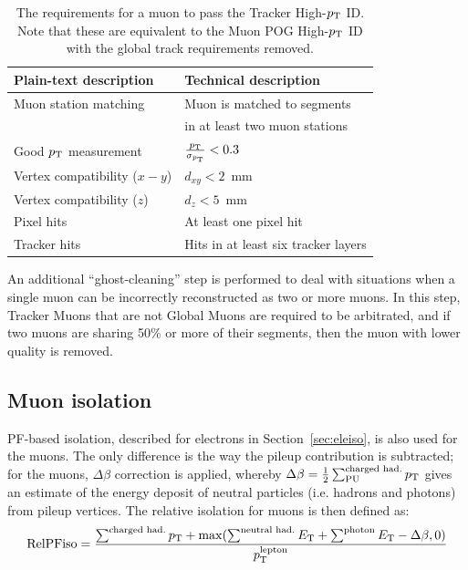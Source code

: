 \begin{table}[h]
    \begin{small}
    \begin{center}
    \begin{tabular}{l|l}
      \hline
      Plain-text description         & Technical description                 \\
      \hline
      Muon station matching          & Muon is matched to segments           \\
                                     & in at least two muon stations         \\
      Good $p_{\rm{T}}$ measurement         & $\frac{p_{\rm{T}}}{\sigma_{p_{\rm{T}}}} < 0.3$      \\
      Vertex compatibility ($x-y$)   & $d_{xy} < 2$~mm                       \\
      Vertex compatibility ($z$)     & $d_{z} < 5$~mm                        \\
      Pixel hits                     & At least one pixel hit                \\
      Tracker hits                   & Hits in at least six tracker layers   \\
      \hline
    \end{tabular}
    \caption{
      The requirements for a muon to pass the Tracker High-$p_{\rm{T}}$ ID. Note that
      these are equivalent to the Muon POG High-$p_{\rm{T}}$ ID with the global track 
      requirements removed.
      }
    \label{tab:highPtID}
    \end{center}
    \end{small}
\end{table}

An additional ``ghost-cleaning'' step is performed to deal with situations when a single muon
can be incorrectly reconstructed as two or more muons. In this step, Tracker Muons that are not Global Muons are required to be arbitrated, and if two muons are sharing 50\% or more of their segments, then the muon with lower quality is removed.

\subsection{Muon isolation}
\label{sec:muoniso}

PF-based isolation, described for electrons in Section~\ref{sec:eleiso}, is also used for the muons. 
The only difference is the way the pileup contribution is subtracted; for the muons, $\Delta\beta$ correction is applied, whereby $\Delta\beta = \frac{1}{2} \sum^\text{charged had.}_\text{PU} p_{\rm{T}}$  gives an estimate of the energy deposit of neutral particles (i.e. hadrons and photons) from pileup vertices. 
The relative isolation for muons is then defined as:
\begin{equation}
\text{RelPFiso} = \frac{\sum^\text{charged had.} p_{\rm{T}} + \max(\sum^\text{neutral had.} E_{\rm{T}} 
+ \sum^\text{photon} E_{\rm{T}} - \Delta \beta, 0)}{p_{\rm{T}}^\text{lepton}}
\label{eqn:mupfiso}
\end{equation}

